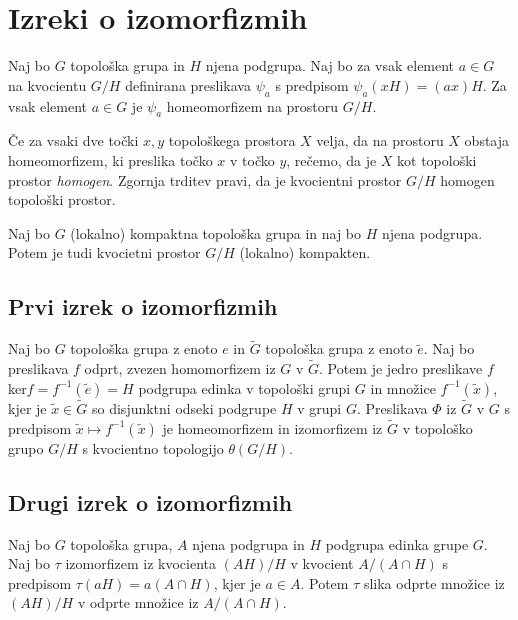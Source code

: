 \documentclass[mat1]{fmfdelo}
\begin{document}
\section{Izreki o izomorfizmih}

\begin{trditev}\label{trd:homogenkvoc}
	Naj bo $G$ topološka grupa in $H$ njena podgrupa. Naj bo za vsak element $a \in G$ na kvocientu $G/H$ definirana preslikava $\psi_a$ s predpisom $\psi_a(xH) = (ax)H$.
	Za vsak element $a \in G$ je $\psi_a$ homeomorfizem na prostoru $G/H$.
\end{trditev}

\begin{opomba}\label{opo:homogenkvoc}
	Če za vsaki dve točki $x, y$ topološkega prostora $X$ velja, da na prostoru $X$ obstaja homeomorfizem, ki preslika točko $x$ v točko $y$, rečemo, da je $X$ kot topološki prostor \emph{homogen}. Zgornja trditev pravi, da je kvocientni prostor $G/H$ homogen topološki prostor.
\end{opomba}

\begin{trditev}\label{trd:kvockompakt}
	Naj bo $G$ (lokalno) kompaktna topološka grupa in naj bo $H$ njena podgrupa. Potem je tudi kvocietni prostor $G/H$ (lokalno) kompakten.
\end{trditev}

\subsection{Prvi izrek o izomorfizmih}
\begin{izrek}\label{izr:prvitopizrek}
Naj bo $G$ topološka grupa z enoto $e$ in $\widetilde{G}$ topološka grupa z enoto $\tilde{e}$. Naj bo preslikava $f$ odprt, zvezen homomorfizem iz $G$ v $\widetilde{G}$. Potem je jedro preslikave $f$ ker$f = f^{-1}(\tilde{e}) = H$ podgrupa edinka v topološki grupi $G$ in množice $f^{-1}(\tilde{x})$, kjer je $\tilde{x} \in \widetilde{G}$ so disjunktni odseki podgrupe $H$ v grupi $G$. Preslikava $\Phi$ iz $\widetilde{G}$ v $G$ s predpisom $\tilde{x} \mapsto f^{-1}(\tilde{x})$ je homeomorfizem in izomorfizem iz $\widetilde{G}$ v topološko grupo $G/H$ s kvocientno topologijo $\theta (G/H)$.
\end{izrek}

\subsection{Drugi izrek o izomorfizmih}
\begin{izrek}\label{izr:preddrugi}
Naj bo $G$ topološka grupa, $A$ njena podgrupa in $H$ podgrupa edinka grupe $G$. Naj bo $\tau$ izomorfizem iz kvocienta $(AH)/H$ v kvocient $A/(A \cap H)$ s predpisom $\tau (aH) = a(A \cap H)$, kjer je $a \in A$. Potem $\tau$ slika odprte množice iz $(AH)/H$ v odprte množice iz $A/(A \cap H)$.
\end{izrek}
\end{document}
